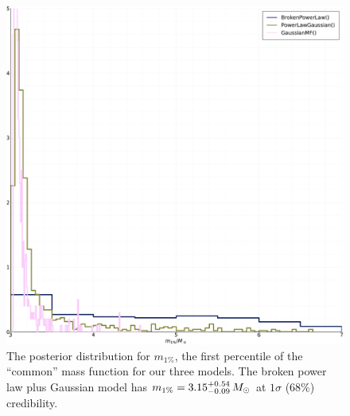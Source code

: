 \documentclass[modern]{aastex631}
\begin{document}
\begin{figure}
    \includegraphics[width=\columnwidth]{figures/m1pct.pdf}
    \caption{\label{fig:m1pct} The posterior distribution for $m_{1\%}$, the
    first percentile of the ``common'' mass function for our three models.  The
    broken power law plus Gaussian model has $m_{1\%} = 3.15^{+0.54}_{-0.09} \, M_\odot$ at
    $1\sigma$ (68\%) credibility.}
\end{figure}
\end{document}
